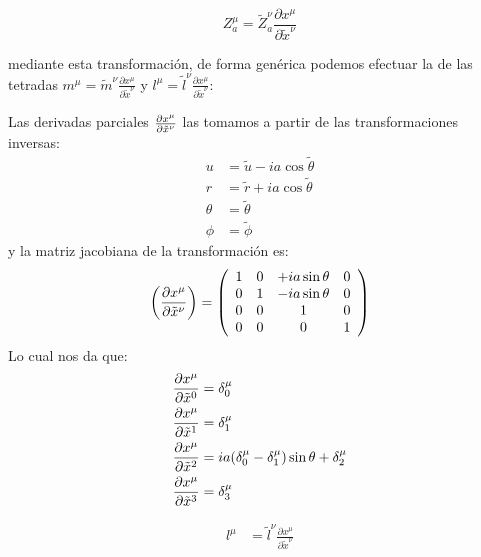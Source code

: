 \begin{enumerate}[1.]
          \begin{equation}
              Z_a^\mu = \tilde{Z}_a^\nu \frac{\partial x^\mu}{\partial \tilde{x}^\nu}
          \end{equation}

          mediante esta transformación, de forma genérica podemos efectuar la de las tetradas $m^\mu = \tilde{m}^\nu \frac{\partial x^\mu}{\partial \tilde{x}^\nu}$ y $l^\mu = \tilde{l}^\nu \frac{\partial x^\mu}{\partial \tilde{x}^\nu}$:
          \begin{note}
            Las derivadas parciales $\frac{\partial x^\mu}{\partial \tilde{x}^\nu}$ las tomamos a partir de las transformaciones inversas:
            $$\begin{aligned} u & =\tilde{u}-i a \cos \tilde{\theta} \\ r & =\tilde{r}+i a \cos \tilde{\theta} \\ \theta & =\tilde{\theta} \\ \phi & =\tilde{\phi}\end{aligned}$$
            y la matriz jacobiana de la transformación es:
            \begin{equation}
               \left(\frac{\partial x^\mu}{\partial \tilde{x}^\nu}\right) =\left(\begin{array}{cccc}
                1 & 0 & +i a \sin \theta & 0\\
                0 & 1 & -i a \sin \theta & 0\\
                0 & 0 & 1 & 0\\
                0 & 0 & 0& 1
                \end{array}\right)
                \end{equation}
                Lo cual nos da que:
                \begin{align*}
                \frac{\partial x^\mu}{\partial \tilde{x}^0}&= \delta^\mu_0\\
                \frac{\partial x^\mu}{\partial \tilde{x}^1}&= \delta^\mu_1\\
                \frac{\partial x^\mu}{\partial \tilde{x}^2}&= ia (\delta^\mu_0 - \delta^\mu_1)\sin \theta + \delta^\mu_2\\
                \frac{\partial x^\mu}{\partial \tilde{x}^3}&=\delta^\mu_3
                \end{align*}
          \end{note}
          \begin{equation}
              \begin{aligned}
                  l^\mu & = \tilde{l}^\nu \frac{\partial x^\mu}{\partial \tilde{x}^\nu}                                                                                                                                                                           \\

\end{aligned}
\end{equation}
\end{enumerate}
